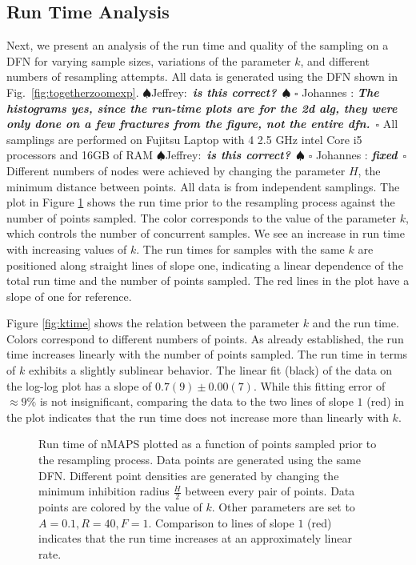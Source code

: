 \documentclass[preprint, 10pt]{elsarticle}
\newif\ifnotesw \noteswtrue
\newcommand{\jeffrey}[1]{\ifnotesw  \textcolor[rgb]{0,0,1}{  $\spadesuit$Jeffrey:\ {\sf \bf \it #1}\ $\spadesuit$ }\fi}
\newcommand{\johannes}[1]{\ifnotesw  \textcolor[rgb]{1,0,1}{ $\square$ Johannes : {\sf \bf \it #1}\ $\square$ }\fi}
\theoremstyle{definition}
\theoremstyle{remark}
\begin{document}
\subsection{Run Time Analysis}
Next, we present an analysis of the run time and quality of the sampling on a DFN for varying sample sizes, variations of the parameter $k$, and different numbers of resampling attempts. 
All data is generated using the DFN shown in Fig.~\ref{fig:togetherzoomexp}. \jeffrey{is this correct?}\johannes{The histograms yes, since the run-time plots are for the 2d alg, they were only done on a few fractures from the figure, not the entire dfn.}
All samplings are performed on Fujitsu Laptop with 4 2.5 GHz intel Core i5 processors and 16GB of RAM \jeffrey{is this correct?}\johannes{fixed}
Different numbers of nodes were achieved by changing the parameter ${H}$, the minimum distance between points. 
All data is from independent samplings.
The plot in Figure \ref{fig:part-time1} shows the run time prior to the resampling process against the number of points sampled.
The color corresponds to the value of the parameter $k$, which controls the number of concurrent samples. 
We see an increase in run time with increasing values of $k$. 
The run times for samples with the same $k$ are positioned along straight lines of slope one, indicating a linear dependence of the total run time and the number of points sampled.
The red lines in the plot have a slope of one for reference. 

Figure \ref{fig:ktime} shows the relation between the parameter $k$ and the run time. Colors correspond to different numbers of points. 
As already established, the run time increases linearly with the number of points sampled.  The run time in terms of $k$ exhibits a slightly sublinear behavior. 
The linear fit (black) of the data on the log-log plot has a slope of $0.7(9)\pm 0.00(7)$. While this fitting error of $\approx 9\%$ is not insignificant, comparing the data to the two lines of slope $1$ (red) in the plot indicates that the run time does not increase more than linearly with $k$.

\begin{figure}
	\centering
	
	\caption{Run time of nMAPS plotted as a function of points sampled prior to the resampling process. 
    Data points are generated using the same DFN. 
    Different point densities are generated by changing the minimum inhibition radius  $\frac{H}{2}$ between every pair of points. 
    Data points are colored by the value of $k$. Other parameters are set to $A=0.1, R=40, F=1$. 
    Comparison to lines of slope $1$ (red) indicates that the run time increases at an approximately linear rate.	\label{fig:part-time1}}
\end{figure}
\end{document}
